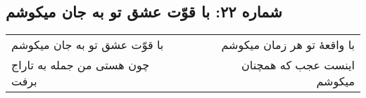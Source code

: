 \begin{center}
\section*{شماره ۲۲: با قوّت عشق تو به جان میکوشم}
\label{sec:022}
\begin{longtable}{l p{0.5cm} r}
با قوّت عشق تو به جان میکوشم
&&
با واقعهٔ تو هر زمان میکوشم
\\
چون هستی من جمله به تاراج برفت
&&
اینست عجب که همچنان میکوشم
\\
\end{longtable}
\end{center}
